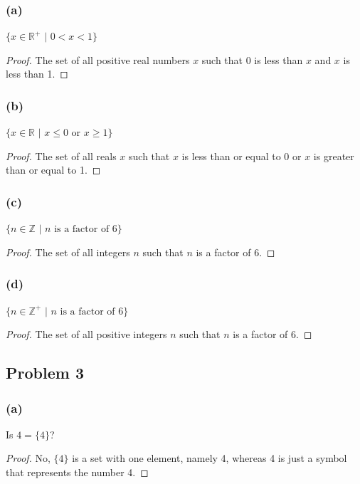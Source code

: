 \documentclass[14pt]{extarticle}
\newcommand{\R}{\mathbb{R}}
\newcommand{\Z}{\mathbb{Z}}
\begin{document}
\subsubsection{(a)}
$\{x \in \R^+ \,\, | \,\, 0 < x < 1\}$

\begin{proof}
    The set of all positive real numbers $x$ such that 0 is less than $x$ and $x$ is
    less than 1.
\end{proof}

\subsubsection{(b)}
$\{x \in \R \,\, | \,\, x \leq 0 \text{ or } x \geq 1\}$

\begin{proof}
    The set of all reals $x$ such that $x$ is less than or equal to 0 or $x$ is
    greater than or equal to 1.
\end{proof}

\subsubsection{(c)}
$\{n \in \Z \,\, | \,\, n \text{ is a factor of } 6\}$

\begin{proof}
    The set of all integers $n$ such that $n$ is a factor of 6.
\end{proof}

\subsubsection{(d)}
$\{n \in \Z^+ \,\, | \,\, n \text{ is a factor of } 6\}$

\begin{proof}
    The set of all positive integers $n$ such that $n$ is a factor of 6.
\end{proof}


\subsection{Problem 3}
\subsubsection{(a)}
Is $4 = \{4\}$?

\begin{proof}
    No, $\{4\}$ is a set with one element, namely 4, whereas 4 is just a symbol that
    represents the number 4.
\end{proof}
\end{document}
